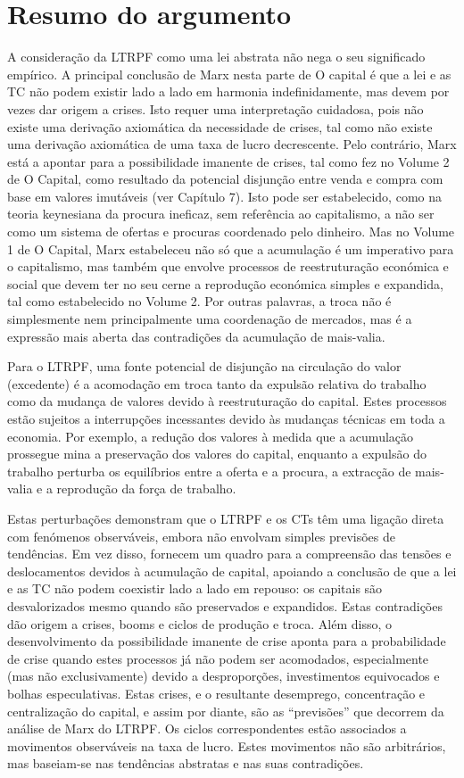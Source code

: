 \section{Resumo do argumento}
 \par 
A consideração da LTRPF como uma lei abstrata não nega o seu significado empírico. A principal conclusão de Marx nesta parte de O capital é que a lei e as TC não podem existir lado a lado em harmonia indefinidamente, mas devem por vezes dar origem a crises. Isto requer uma interpretação cuidadosa, pois não existe uma derivação axiomática da necessidade de crises, tal como não existe uma derivação axiomática de uma taxa de lucro decrescente. Pelo contrário, Marx está a apontar para a possibilidade imanente de crises, tal como fez no Volume {\color{blue}2} de O Capital, como resultado da potencial disjunção entre venda e compra com base em valores imutáveis ​​(ver Capítulo {\color{blue}7}). Isto pode ser estabelecido, como na teoria keynesiana da procura ineficaz, sem referência ao capitalismo, a não ser como um sistema de ofertas e procuras coordenado pelo dinheiro. Mas no Volume {\color{blue}1} de O Capital, Marx estabeleceu não só que a acumulação é um imperativo para o capitalismo, mas também que envolve processos de reestruturação económica e social que devem ter no seu cerne a reprodução económica simples e expandida, tal como estabelecido no Volume {\color{blue}2}. Por outras palavras, a troca não é simplesmente nem principalmente uma coordenação de mercados, mas é a expressão mais aberta das contradições da acumulação de mais-valia.
 \par 
Para o LTRPF, uma fonte potencial de disjunção na circulação do valor (excedente) é a acomodação em troca tanto da expulsão relativa do trabalho como da mudança de valores devido à reestruturação do capital. Estes processos estão sujeitos a interrupções incessantes devido às mudanças técnicas em toda a economia. Por exemplo, a redução dos valores à medida que a acumulação prossegue mina a preservação dos valores do capital, enquanto a expulsão do trabalho perturba os equilíbrios entre a oferta e a procura, a extracção de mais-valia e a reprodução da força de trabalho.
 \par 
Estas perturbações demonstram que o LTRPF e os CTs têm uma ligação direta com fenómenos observáveis, embora não envolvam simples previsões de tendências. Em vez disso, fornecem um quadro para a compreensão das tensões e deslocamentos devidos à acumulação de capital, apoiando a conclusão de que a lei e as TC não podem coexistir lado a lado em repouso: os capitais são desvalorizados mesmo quando são preservados e expandidos. Estas contradições dão origem a crises, booms e ciclos de produção e troca. Além disso, o desenvolvimento da possibilidade imanente de crise aponta para a probabilidade de crise quando estes processos já não podem ser acomodados, especialmente (mas não exclusivamente) devido a desproporções, investimentos equivocados e bolhas especulativas. Estas crises, e o resultante desemprego, concentração e centralização do capital, e assim por diante, são as “previsões” que decorrem da análise de Marx do LTRPF. Os ciclos correspondentes estão associados a movimentos observáveis ​​na taxa de lucro. Estes movimentos não são arbitrários, mas baseiam-se nas tendências abstratas e nas suas contradições.
